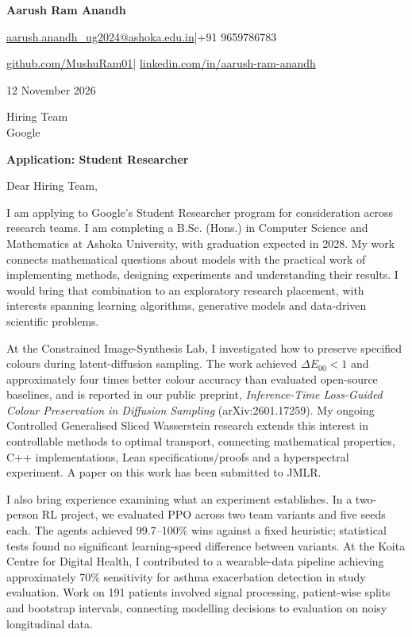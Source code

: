 \documentclass[11pt,a4paper]{article}
\begin{document}
{\LARGE\bfseries Aarush Ram Anandh}\par\vspace{4pt}
\href{mailto:aarush.anandh_ug2024@ashoka.edu.in}{aarush.anandh\_ug2024@ashoka.edu.in}\quad|\quad +91 9659786783\par\vspace{2pt}
\href{https://github.com/MushuRam01}{github.com/MushuRam01}\quad|\quad
\href{https://www.linkedin.com/in/aarush-ram-anandh/}{linkedin.com/in/aarush-ram-anandh}\par
\vspace{20pt}
12 November 2026\par\vspace{12pt}
Hiring Team\\
Google\par\vspace{12pt}
\textbf{Application: Student Researcher}\par\vspace{14pt}
Dear Hiring Team,\par\vspace{10pt}
I am applying to Google's Student Researcher program for consideration across research teams. I am completing a B.Sc. (Hons.) in Computer Science and Mathematics at Ashoka University, with graduation expected in 2028. My work connects mathematical questions about models with the practical work of implementing methods, designing experiments and understanding their results. I would bring that combination to an exploratory research placement, with interests spanning learning algorithms, generative models and data-driven scientific problems.\par\vspace{10pt}
At the Constrained Image-Synthesis Lab, I investigated how to preserve specified colours during latent-diffusion sampling. The work achieved $\Delta E_{00}<1$ and approximately four times better colour accuracy than evaluated open-source baselines, and is reported in our public preprint, \textit{Inference-Time Loss-Guided Colour Preservation in Diffusion Sampling} (arXiv:2601.17259). My ongoing Controlled Generalised Sliced Wasserstein research extends this interest in controllable methods to optimal transport, connecting mathematical properties, C++ implementations, Lean specifications/proofs and a hyperspectral experiment. A paper on this work has been submitted to JMLR.\par\vspace{10pt}
I also bring experience examining what an experiment establishes. In a two-person RL project, we evaluated PPO across two team variants and five seeds each. The agents achieved 99.7--100\% wins against a fixed heuristic; statistical tests found no significant learning-speed difference between variants. At the Koita Centre for Digital Health, I contributed to a wearable-data pipeline achieving approximately 70\% sensitivity for asthma exacerbation detection in study evaluation. Work on 191 patients involved signal processing, patient-wise splits and bootstrap intervals, connecting modelling decisions to evaluation on noisy longitudinal data.\par\vspace{10pt}
\end{document}
